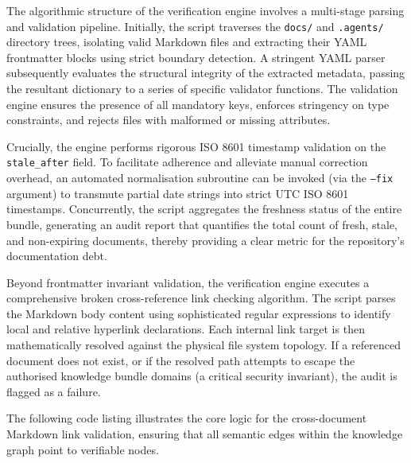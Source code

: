 The algorithmic structure of the verification engine involves a multi-stage parsing and validation pipeline. Initially, the script traverses the \texttt{docs/} and \texttt{.agents/} directory trees, isolating valid Markdown files and extracting their YAML frontmatter blocks using strict boundary detection. A stringent YAML parser subsequently evaluates the structural integrity of the extracted metadata, passing the resultant dictionary to a series of specific validator functions. The validation engine ensures the presence of all mandatory keys, enforces stringency on type constraints, and rejects files with malformed or missing attributes.

Crucially, the engine performs rigorous ISO 8601 timestamp validation on the \texttt{stale\_after} field. To facilitate adherence and alleviate manual correction overhead, an automated normalisation subroutine can be invoked (via the \texttt{--fix} argument) to transmute partial date strings into strict UTC ISO 8601 timestamps. Concurrently, the script aggregates the freshness status of the entire bundle, generating an audit report that quantifies the total count of fresh, stale, and non-expiring documents, thereby providing a clear metric for the repository's documentation debt.

Beyond frontmatter invariant validation, the verification engine executes a comprehensive broken cross-reference link checking algorithm. The script parses the Markdown body content using sophisticated regular expressions to identify local and relative hyperlink declarations. Each internal link target is then mathematically resolved against the physical file system topology. If a referenced document does not exist, or if the resolved path attempts to escape the authorised knowledge bundle domains (a critical security invariant), the audit is flagged as a failure.

The following code listing illustrates the core logic for the cross-document Markdown link validation, ensuring that all semantic edges within the knowledge graph point to verifiable nodes.

